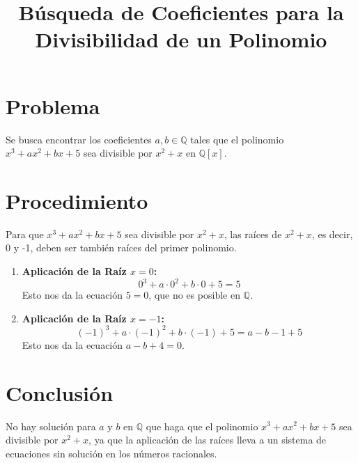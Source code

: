 \documentclass{article}
\begin{document}
\title{Búsqueda de Coeficientes para la Divisibilidad de un Polinomio}
\author{}
\date{}
\maketitle

\section*{Problema}
Se busca encontrar los coeficientes \( a, b \in \mathbb{Q} \) tales que el polinomio \( x^3 + ax^2 + bx + 5 \) sea divisible por \( x^2 + x \) en \( \mathbb{Q}[x] \).

\section*{Procedimiento}

Para que \( x^3 + ax^2 + bx + 5 \) sea divisible por \( x^2 + x \), las raíces de \( x^2 + x \), es decir, 0 y -1, deben ser también raíces del primer polinomio.

\begin{enumerate}
    \item \textbf{Aplicación de la Raíz \( x = 0 \):}
    \begin{equation*}
        0^3 + a \cdot 0^2 + b \cdot 0 + 5 = 5
    \end{equation*}
    Esto nos da la ecuación \( 5 = 0 \), que no es posible en \( \mathbb{Q} \).

    \item \textbf{Aplicación de la Raíz \( x = -1 \):}
    \begin{equation*}
        (-1)^3 + a \cdot (-1)^2 + b \cdot (-1) + 5 = a - b - 1 + 5
    \end{equation*}
    Esto nos da la ecuación \( a - b + 4 = 0 \).
\end{enumerate}

\section*{Conclusión}

No hay solución para \( a \) y \( b \) en \( \mathbb{Q} \) que haga que el polinomio \( x^3 + ax^2 + bx + 5 \) sea divisible por \( x^2 + x \), ya que la aplicación de las raíces lleva a un sistema de ecuaciones sin solución en los números racionales.
\end{document}
